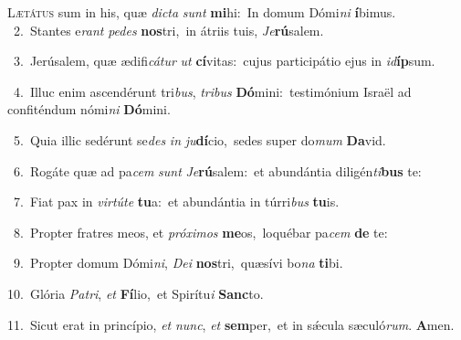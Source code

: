 \lettrine{\initial\textcolor{\initialcolor}{L}}{ætátus} sum in his, quæ \textit{dic}\-\textit{ta} \textit{sunt} \textbf{mi}\-hi:~\star In domum Dómi\textit{ni} \textbf{í}\-bimus.\\
{\numbfont\textcolor{\numbcolor}{~2.}}~Stantes e\textit{rant} \textit{pe}\-\textit{des} \textbf{nos}\-tri,~\star in átriis tuis, \textit{Je}\-\textbf{rú}salem.\par
{\numbfont\textcolor{\numbcolor}{~3.}}~Jerúsalem, quæ ædifi\-\textit{cá}\-\textit{tur} \textit{ut} \textbf{cí}\-vitas:~\star cujus participátio ejus in \textit{id}\-\textbf{íp}sum.\par
{\numbfont\textcolor{\numbcolor}{~4.}}~Illuc enim ascendérunt tri\-\textit{bus}\-, \textit{tri}\-\textit{bus} \textbf{Dó}\-mini:~\star testimónium Israël ad confiténdum nómi\textit{ni} \textbf{Dó}\-mini.\par
{\numbfont\textcolor{\numbcolor}{~5.}}~Quia illic sedérunt se\textit{des} \textit{in} \textit{ju}\-\textbf{dí}cio,~\star sedes super do\textit{mum} \textbf{Da}\-vid.\par
{\numbfont\textcolor{\numbcolor}{~6.}}~Rogáte quæ ad pa\textit{cem} \textit{sunt} \textit{Je}\-\textbf{rú}salem:~\star et abundántia diligén\-\textit{ti}\-\textbf{bus} te:\par
{\numbfont\textcolor{\numbcolor}{~7.}}~Fiat pax in \textit{vir}\-\textit{tú}\textit{te} \textbf{tu}\-a:~\star et abundántia in túrri\textit{bus} \textbf{tu}\-is.\par
{\numbfont\textcolor{\numbcolor}{~8.}}~Propter fratres meos, et \textit{pró}\-\textit{xi}\textit{mos} \textbf{me}\-os,~\star loquébar pa\textit{cem} \textbf{de} te:\par
{\numbfont\textcolor{\numbcolor}{~9.}}~Propter domum Dómi\-\textit{ni}\-, \textit{De}\-\textit{i} \textbf{nos}\-tri,~\star quæsívi bo\textit{na} \textbf{ti}\-bi.\par
{\numbfont\textcolor{\numbcolor}{10.}}~Glória \textit{Pa}\-\textit{tri}, \textit{et} \textbf{Fí}\-lio,~\star et Spirítu\textit{i} \textbf{Sanc}\-to.\par
{\numbfont\textcolor{\numbcolor}{11.}}~Sicut erat in princípio, \textit{et} \textit{nunc}\-, \textit{et} \textbf{sem}\-per,~\star et in sǽcula sæculó\-\textit{rum}\-. \textbf{A}\-men.\par
